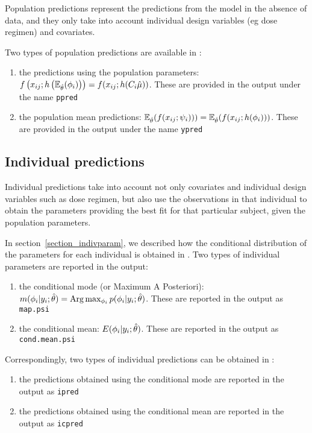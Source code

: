 Population predictions represent the predictions from the model in the absence of data, and they only take into account individual design variables (eg dose regimen) and covariates.

Two types of population predictions are available in \monolix:
\begin{enumerate}
  \item the predictions using the population parameters: $f\left(x_{ij} ; h\left( \mathbb{E}_{\hat{\theta}}(\phigi) \right) \right)= f(x_{ij} ; h(C_i \hat{\fixed_effect}))$. These are provided in the output under the name \texttt{ppred}
  \item the population mean predictions:  $\mathbb{E}_{\hat{\theta}}(f(x_{ij} ; {\psi_i}) ))=\mathbb{E}_{\hat{\theta}}(f(x_{ij} ; h({{\phi}_i}) ))$. These are provided in the output under the name \texttt{ypred}
\end{enumerate}

\subsection{Individual predictions}

Individual predictions take into account not only covariates and individual design variables such as dose regimen, but also use the observations in that individual to obtain the parameters providing the best fit for that particular subject, given the population parameters.

In section~\ref{section_indivparam}, we described how the conditional distribution of the parameters for each individual is obtained in \monolix. Two types of individual parameters are reported in the output:
\begin{enumerate}
\item the conditional mode (or Maximum A Posteriori): $ m({{\phi}_i}|y_i;\hat{\theta})={\rm Arg}\max_{{\phi}_i} p({{\phi}_i}|y_i;\hat{\theta})$. These are reported in the output as \texttt{map.psi}
\item the conditional mean: $ E({{\phi}_i}|y_i;\hat{\theta})$. These are reported in the output as \texttt{cond.mean.psi}
\end{enumerate}
Correspondingly, two types of individual predictions can be obtained in \monolix:
\begin{enumerate}
\item the predictions obtained using the conditional mode are reported in the output as \texttt{ipred}
\item the predictions obtained using the conditional mean are reported in the output as \texttt{icpred}
\end{enumerate}

